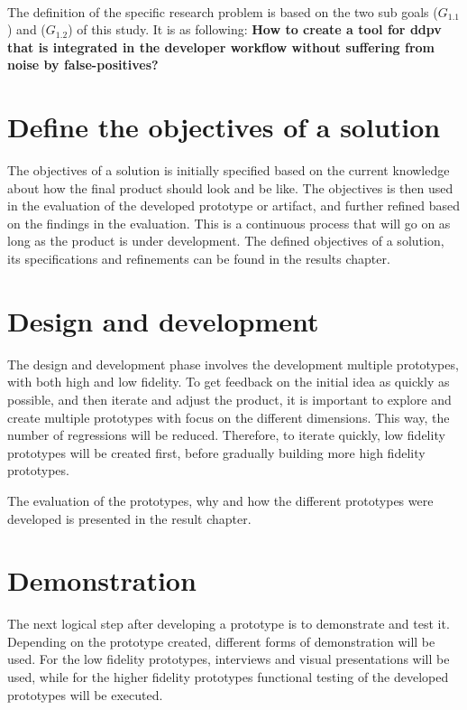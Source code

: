 \documentclass[pdftex,10pt,b5paper,twoside]{report}
\begin{document}
\\ The definition of the specific research problem is based on the two sub goals (\(G_{1.1}\)) and (\(G_{1.2}\)) of this study. It is as following: \textbf{How to create a tool for \gls{ddpv} that is integrated in the developer workflow without suffering from noise by false-positives?}

\section{Define the objectives of a solution}
\label{objectives-of-solution}
The objectives of a solution is initially specified based on the current knowledge about how the final product should look and be like. The objectives is then used in the evaluation of the developed prototype or artifact, and further refined based on the findings in the evaluation. This is a continuous process that will go on as long as the product is under development. The defined objectives of a solution, its specifications and refinements can be found in the results chapter.

\section{Design and development}
\label{design-development}

The design and development phase involves the development multiple prototypes, with both high and low fidelity. To get feedback on the initial idea as quickly as possible, and then iterate and adjust the product, it is important to explore and create multiple prototypes with focus on the different dimensions. This way, the number of regressions will be reduced. Therefore, to iterate quickly, low fidelity prototypes will be created first, before gradually building more high fidelity prototypes.

The evaluation of the prototypes, why and how the different prototypes were developed is presented in the result chapter.

\section{Demonstration}

The next logical step after developing a prototype is to demonstrate and test it. Depending on the prototype created, different forms of demonstration will be used. For the low fidelity prototypes, interviews and visual presentations will be used, while for the higher fidelity prototypes functional testing of the developed prototypes will be executed. 
\end{document}
